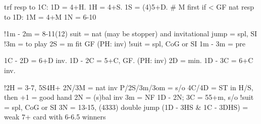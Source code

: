 trf resp to 1C: 1D = 4+H. 1H = 4+S. 1S = (4)5+D.  # M first if < GF
nat resp to 1D: 1M = 4+M
1N = 6-10

!1m - 2m = 8-11(12)
    suit = nat (may be stopper) and invitational
    jump = spl, SI
    !3m = to play
2S = m fit GF (PH: inv)
    !suit = spl, CoG or SI
1m - 3m = pre

1C - 2D = 6+D inv.
1D - 2C = 5+C, GF. (PH: inv)
    2D = min.
1D - 3C = 6+C inv.

!2H = 3-7, 5S4H+
    2N/3M = nat inv
    P/2S/3m/3om = s/o
    4C/4D = ST in H/S, then +1 = good hand
2N = (s)bal inv
    3m = NF
    1D - 2N; 3C = 55+m, s/o
    !suit = spl, CoG or SI
3N = 13-15, (4333)
double jump (1D - 3HS & 1C - 3DHS) = weak 7+ card with 6-6.5 winners